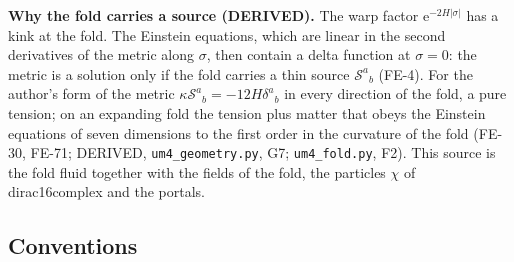 \documentclass[
  10pt,
]{article}
\begin{document}
\textbf{Why the fold carries a source (DERIVED).} The warp factor
\(\mathrm{e}^{-2H\lvert\sigma\rvert}\) has a kink at the fold. The
Einstein equations, which are linear in the second derivatives of the
metric along \(\sigma\), then contain a delta function at
\(\sigma = 0\): the metric is a solution only if the fold carries a thin
source \(\mathcal{S}^a{}_b\) (FE-4). For the author's form of the metric
\(\kappa\mathcal{S}^a{}_b = -12H\delta^a{}_b\) in every direction of the
fold, a pure tension; on an expanding fold the tension plus matter that
obeys the Einstein equations of seven dimensions to the first order in
the curvature of the fold (FE-30, FE-71; DERIVED,
\texttt{um4\_geometry.py}, G7; \texttt{um4\_fold.py}, F2). This source
is the fold fluid together with the fields of the fold, the particles
\(\chi\) of dirac16complex and the portals.

\hypertarget{conventions}{%
\subsection{Conventions}\label{conventions}}
\end{document}
